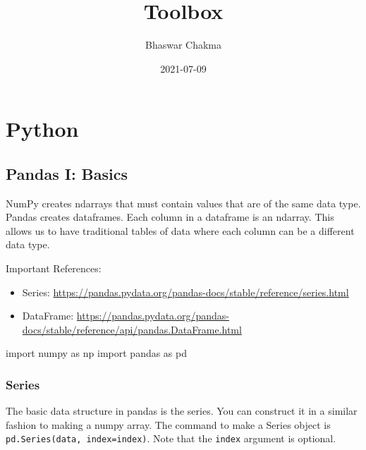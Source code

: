 \documentclass[
]{book}
\title{Toolbox}
\author{Bhaswar Chakma}
\date{2021-07-09}
\newenvironment{Shaded}{\begin{snugshade}}{\end{snugshade}}
\newcommand{\ImportTok}[1]{#1}
\newcommand{\NormalTok}[1]{#1}
\begin{document}
\maketitle

{
\setcounter{tocdepth}{1}
\tableofcontents
}
\hypertarget{section}{%
\chapter*{}\label{section}}

\hypertarget{python}{%
\chapter{Python}\label{python}}

\hypertarget{pandas-i-basics}{%
\section{Pandas I: Basics}\label{pandas-i-basics}}

NumPy creates ndarrays that must contain values that are of the same data type.
Pandas creates dataframes. Each column in a dataframe is an ndarray. This allows us to have
traditional tables of data where each column can be a different data type.

Important References:

\begin{itemize}
\item
  Series: \url{https://pandas.pydata.org/pandas-docs/stable/reference/series.html}
\item
  DataFrame: \url{https://pandas.pydata.org/pandas-docs/stable/reference/api/pandas.DataFrame.html}
\end{itemize}

\begin{Shaded}
\begin{Highlighting}[]
\ImportTok{import}\NormalTok{ numpy }\ImportTok{as}\NormalTok{ np}
\ImportTok{import}\NormalTok{ pandas }\ImportTok{as}\NormalTok{ pd}
\end{Highlighting}
\end{Shaded}

\hypertarget{series}{%
\subsection{Series}\label{series}}

The basic data structure in pandas is the series. You can construct it in a similar fashion to making a numpy array. The command to make a Series object is
\texttt{pd.Series(data,\ index=index)}. Note that the \texttt{index} argument is optional.
\end{document}
